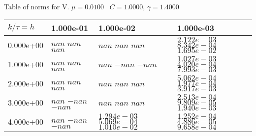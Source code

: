 \begin{center}
Table of norms for V. $\mu = 0.0100$ \, $C = 1.0000$, $\gamma = 1.4000$
  
\begin{tabular}{|p{1in}|p{1in}|p{1in}|p{1in}|} \hline
$k / \tau = h$ &1.000e-01 &1.000e-02 &1.000e-03 \\ \hline 
0.000e+00 & $nan$  $nan$  $nan$  & $nan$  $nan$  $nan$  & $2.122e-03$  $8.342e-04$  $1.695e-02$  \\ \hline 
1.000e+00 & $nan$  $nan$  $nan$  & $nan$  $-nan$  $-nan$  & $1.027e-03$  $4.020e-04$  $7.993e-03$  \\ \hline 
2.000e+00 & $nan$  $nan$  $nan$  & $nan$  $nan$  $nan$  & $5.062e-04$  $1.977e-04$  $3.917e-03$  \\ \hline 
3.000e+00 & $nan$  $-nan$  $-nan$  & $nan$  $nan$  $nan$  & $2.513e-04$  $9.809e-05$  $1.940e-03$  \\ \hline 
4.000e+00 & $nan$  $-nan$  $-nan$  & $1.294e-03$  $5.069e-04$  $1.010e-02$  & $1.252e-04$  $4.886e-05$  $9.658e-04$  \\ \hline 

\end{tabular}\\[20pt]
\end{center}
